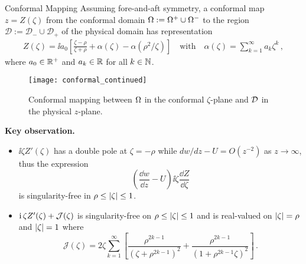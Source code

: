 \begin{block}{Conformal Mapping}
  Assuming fore-and-aft symmetry, a conformal map $z=Z (\zeta)$ from the
  conformal domain
  $ \Omega:= \Omega^{+} \cup \Omega^{-}$
  to the region
  $\mathcal{D} := \mathcal{D}_{-}\cup\mathcal{D}_{+}$ of the physical
  domain has representation
  \begin{gather}
    \label{eq:conformal}
    Z(\zeta) = \ii a_{0} \left[ \frac{\zeta - \rho}{\zeta + \rho} +
      \alpha(\zeta) - \alpha(\rho^{2}/\zeta) \right]
    \quad\text{with}\quad \alpha(\zeta) = \sum_{k=1}^{\infty} a_{k}
    \zeta^{k} \,,
  \end{gather}
  where $a_{0} \in \mathbb{R}^{+}$ and $a_{k} \in \mathbb{R}$ for all $k \in \mathbb{N}$.

  \begin{figure}\label{fig:conformal}
    \centering
    \texttt{[image: conformal\_continued]}
    \caption{Conformal mapping between $\Omega$ in the conformal
      $\zeta$-plane and $\mathcal{D}$ in the physical $z$-plane.}
  \end{figure}

  \textbf{Key observation.}
  \begin{itemize}
  \item $\ii \zeta Z'(\zeta)$ has a double pole at $\zeta = -\rho$
    while $dw/dz - U = O(z^{-2})$ as $z \to \infty$, thus the
    expression
    \begin{equation*}
      \left( \frac{\dd w}{\dd z} - U \right)
      \ii \zeta \frac{\dd Z}{\dd \zeta}
    \end{equation*}
    is singularity-free in $\rho \le \left|\zeta\right| \le 1$.
  \item $\operatorname{i}  \zeta Z'(\zeta) + \mathcal{J}(\zeta)$ is singularity-free on
    $\rho \le \left|\zeta\right| \le 1$ and is real-valued on
    $\left|\zeta\right| = \rho$ and $\left|\zeta\right| = 1$ where
    \begin{equation*}
      \mathcal{J} (\zeta) =  2 \zeta \sum_{k=1}^\infty \left[
        \frac{\rho^{2k-1}}{(\zeta+\rho^{2k-1})^2}
        +\frac{\rho^{2k-1}}{(1+\rho^{2k-1} \zeta)^2}
      \right] \,.
    \end{equation*}
  \end{itemize}
\end{block}


